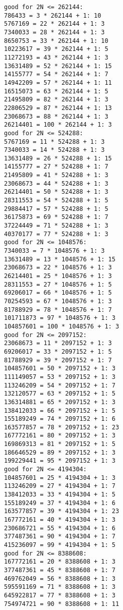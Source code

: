 \begin{verbatim}
good for 2N <= 262144:
786433 = 3 * 262144 + 1: 10
5767169 = 22 * 262144 + 1: 3
7340033 = 28 * 262144 + 1: 3
8650753 = 33 * 262144 + 1: 10
10223617 = 39 * 262144 + 1: 5
11272193 = 43 * 262144 + 1: 3
13631489 = 52 * 262144 + 1: 15
14155777 = 54 * 262144 + 1: 7
14942209 = 57 * 262144 + 1: 11
16515073 = 63 * 262144 + 1: 5
21495809 = 82 * 262144 + 1: 3
22806529 = 87 * 262144 + 1: 13
23068673 = 88 * 262144 + 1: 3
26214401 = 100 * 262144 + 1: 3
good for 2N <= 524288:
5767169 = 11 * 524288 + 1: 3
7340033 = 14 * 524288 + 1: 3
13631489 = 26 * 524288 + 1: 15
14155777 = 27 * 524288 + 1: 7
21495809 = 41 * 524288 + 1: 3
23068673 = 44 * 524288 + 1: 3
26214401 = 50 * 524288 + 1: 3
28311553 = 54 * 524288 + 1: 5
29884417 = 57 * 524288 + 1: 5
36175873 = 69 * 524288 + 1: 7
37224449 = 71 * 524288 + 1: 3
40370177 = 77 * 524288 + 1: 3
good for 2N <= 1048576:
7340033 = 7 * 1048576 + 1: 3
13631489 = 13 * 1048576 + 1: 15
23068673 = 22 * 1048576 + 1: 3
26214401 = 25 * 1048576 + 1: 3
28311553 = 27 * 1048576 + 1: 5
69206017 = 66 * 1048576 + 1: 5
70254593 = 67 * 1048576 + 1: 3
81788929 = 78 * 1048576 + 1: 7
101711873 = 97 * 1048576 + 1: 3
104857601 = 100 * 1048576 + 1: 3
good for 2N <= 2097152:
23068673 = 11 * 2097152 + 1: 3
69206017 = 33 * 2097152 + 1: 5
81788929 = 39 * 2097152 + 1: 7
104857601 = 50 * 2097152 + 1: 3
111149057 = 53 * 2097152 + 1: 3
113246209 = 54 * 2097152 + 1: 7
132120577 = 63 * 2097152 + 1: 5
136314881 = 65 * 2097152 + 1: 3
138412033 = 66 * 2097152 + 1: 5
155189249 = 74 * 2097152 + 1: 6
163577857 = 78 * 2097152 + 1: 23
167772161 = 80 * 2097152 + 1: 3
169869313 = 81 * 2097152 + 1: 5
186646529 = 89 * 2097152 + 1: 3
199229441 = 95 * 2097152 + 1: 3
good for 2N <= 4194304:
104857601 = 25 * 4194304 + 1: 3
113246209 = 27 * 4194304 + 1: 7
138412033 = 33 * 4194304 + 1: 5
155189249 = 37 * 4194304 + 1: 6
163577857 = 39 * 4194304 + 1: 23
167772161 = 40 * 4194304 + 1: 3
230686721 = 55 * 4194304 + 1: 6
377487361 = 90 * 4194304 + 1: 7
415236097 = 99 * 4194304 + 1: 5
good for 2N <= 8388608:
167772161 = 20 * 8388608 + 1: 3
377487361 = 45 * 8388608 + 1: 7
469762049 = 56 * 8388608 + 1: 3
595591169 = 71 * 8388608 + 1: 3
645922817 = 77 * 8388608 + 1: 3
754974721 = 90 * 8388608 + 1: 11
\end{verbatim}
